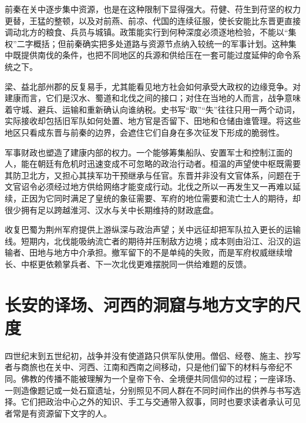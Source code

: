 前秦在关中逐步集中资源，也是在这种限制下显得强大。苻健、苻生到苻坚的权力更替，王猛的整顿，以及对前燕、前凉、代国的连续征服，使长安能比东晋更直接调动北方的粮食、兵员与城镇。政策能实行到何种深度必须逐地检验，不能以“集权”二字概括；但前秦确实把多处道路与资源节点纳入较统一的军事计划。这种集中既提供南伐的条件，也把不同地区的兵源和供给压在一套可能过度延伸的命令系统之下。

梁、益北部州郡的反复易手，尤其能看见地方社会如何承受大政权的边缘竞争。对建康而言，它们是汉水、蜀道和北伐之间的接口；对住在当地的人而言，战争意味着守城、避兵、运输和重新确认向谁纳税。史书写“取”“失”往往只用一两个动词，实际接收却包括旧军队如何处置、地方官是否留下、田地和仓储由谁管理。将这些地区只看成东晋与前秦的边界，会遮住它们自身在多次征发下形成的脆弱性。

军事财政也塑造了建康内部的权力。一个能够筹集船队、安置军士和控制江面的人，能在朝廷有危机时迅速变成不可忽略的政治行动者。桓温的声望使中枢既需要其防卫北方，又担心其挟军功干预继承与任官。东晋并非没有文官体系，问题在于文官诏令必须经过地方供给网络才能变成行动。北伐之所以一再发生又一再难以延续，正因为它同时满足了皇统的象征需要、军府的地位需要和流亡士人的期待，却很少拥有足以跨越淮河、汉水与关中长期维持的财政底盘。

\begin{causalchain}[北伐为何反复越过边界又难以留下]
收复巴蜀为荆州军府提供上游纵深与政治声望；关中远征却把军队拉入更长的运输线。短期内，北伐能吸纳流亡者的期待并压制敌方边境；成本则由沿江、沿汉的运输者、田地与地方中介承担。撤军留下的不是单纯的失败，而是军府权威继续增长、中枢更依赖掌兵者、下一次北伐更难摆脱同一供给难题的反馈。
\end{causalchain}

\section{长安的译场、河西的洞窟与地方文字的尺度}
\label{sec:eastern-jin-depth-religion-regions}

四世纪末到五世纪初，战争并没有使道路只供军队使用。僧侣、经卷、施主、抄写者与商旅也在关中、河西、江南和西南之间移动，只是他们留下的材料与帝纪不同。佛教的传播不能被理解为一个皇帝下令、全境便共同信仰的过程；一座译场、一则造像题记或一处石窟遗址，分别照见不同人群在不同时间作出的供养与书写选择。它们把政治中心之外的知识、手工与交通带入叙事，同时也要求读者承认可见者常是有资源留下文字的人。

